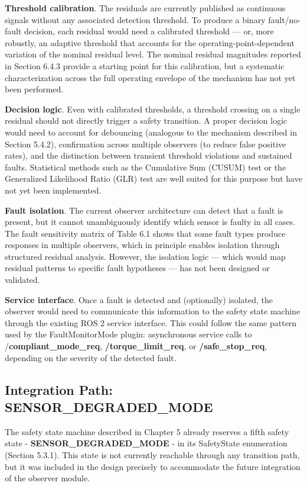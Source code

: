 \textbf{Threshold calibration}. The residuals are currently published as continuous signals without any associated detection threshold. To produce a binary fault/no-fault decision, each residual would need a calibrated threshold — or, more robustly, an adaptive threshold that accounts for the operating-point-dependent variation of the nominal residual level. The nominal residual magnitudes reported in Section 6.4.3 provide a starting point for this calibration, but a systematic characterization across the full operating envelope of the mechanism has not yet been performed.

\textbf{Decision logic}. Even with calibrated thresholds, a threshold crossing on a single residual should not directly trigger a safety transition. A proper decision logic would need to account for debouncing (analogous to the mechanism described in Section 5.4.2), confirmation across multiple observers (to reduce false positive rates), and the distinction between transient threshold violations and sustained faults. Statistical methods such as the Cumulative Sum (CUSUM) test or the Generalized Likelihood Ratio (GLR) test are well suited for this purpose but have not yet been implemented.

\textbf{Fault isolation}. The current observer architecture can detect that a fault is present, but it cannot unambiguously identify which sensor is faulty in all cases. The fault sensitivity matrix of Table 6.1 shows that some fault types produce responses in multiple observers, which in principle enables isolation through structured residual analysis. However, the isolation logic — which would map residual patterns to specific fault hypotheses — has not been designed or validated.

\textbf{Service interface}. Once a fault is detected and (optionally) isolated, the observer would need to communicate this information to the safety state machine through the existing ROS 2 service interface. This could follow the same pattern used by the FaultMonitorMode plugin: asynchronous service calls to /\textbf{compliant\_mode\_req}, \textbf{/torque\_limit\_req}, or \textbf{/safe\_stop\_req}, depending on the severity of the detected fault.

\subsection{Integration Path: SENSOR\_DEGRADED\_MODE}
The safety state machine described in Chapter 5 already reserves a fifth safety state - \textbf{SENSOR\_DEGRADED\_MODE} - in its SafetyState enumeration (Section 5.3.1). This state is not currently reachable through any transition path, but it was included in the design precisely to accommodate the future integration of the observer module.

